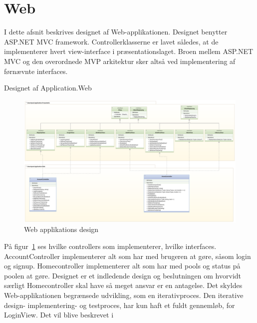 \section{Web}
I dette afsnit beskrives designet af Web-applikationen. Designet benytter ASP.NET MVC framework. Controllerklasserne er lavet således, at de implementerer hvert view-interface i præsentationslaget. Broen mellem ASP.NET MVC og den overordnede MVP arkitektur sker altså ved implementering af førnævnte interfaces.

Designet af Application.Web
\begin{landscape}
\begin{figure}
	\centering
	\includegraphics[width=1\linewidth]{figs/design/application_web}
	\caption{Web applikations design}
	\label{fig:web_class}
\end{figure}
\end{landscape}
På figur~\ref{fig:web_class} ses hvilke controllers som implementerer, hvilke interfaces. AccountController implementerer alt som har med brugeren at gøre, såsom login og signup. Homecontroller implementerer alt som har med pools og status på poolen at gøre. Designet er et indledende design og beslutningen om hvorvidt særligt Homecontroller skal have så meget ansvar er en antagelse. Det skyldes Web-applikationen begrænsede udvikling, som en iterativproces. Den iterative design- implementering- og testproces, har kun haft et fuldt gennemløb, for LoginView. Det vil blive beskrevet i 

